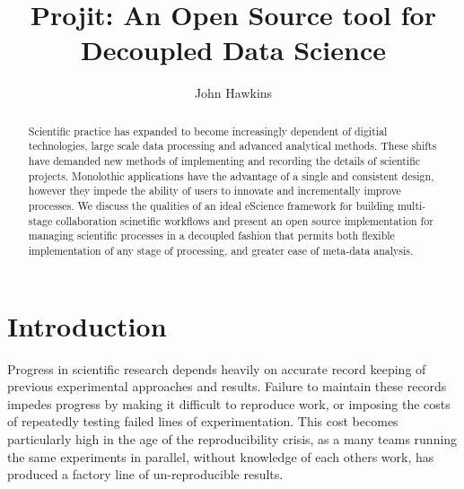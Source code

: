 \documentclass[sigconf]{acmart}
\begin{document}
\title{Projit: An Open Source tool for Decoupled Data Science}

\author{John Hawkins}

\renewcommand{\shortauthors}{Hawkins}

\begin{abstract} 
Scientific practice has expanded to become increasingly dependent of digitial technologies,
large scale data processing and advanced analytical methods. These shifts have demanded new
methods of implementing and recording the details of scientific projects. Monolothic applications
have the advantage of a single and consistent design, however they impede the ability of users to
innovate and incrementally improve processes. We discuss the qualities of an ideal eScience framework
for building multi-stage collaboration scinetific workflows and present an open source implementation
for managing scientific processes in a decoupled fashion that permits both flexible implementation of
any stage of processing, and greater ease of meta-data analysis.
\end{abstract}



\maketitle

\section{Introduction}

Progress in scientific research depends heavily on accurate record keeping of previous
experimental approaches and results. Failure to maintain these records impedes progress
by making it difficult to reproduce work, or imposing the costs of repeatedly testing 
failed lines of experimentation. This cost becomes particularly high in the age of the
reproducibility crisis, as a many teams running the same experiments in parallel, without
knowledge of each others work, has produced a factory line of un-reproducible results.
 
\end{document}

